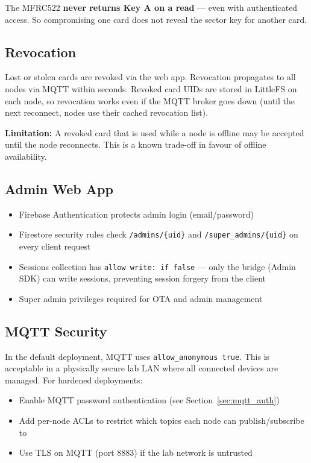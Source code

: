 The MFRC522 \textbf{never returns Key A on a read} --- even with authenticated access. So compromising one card does not reveal the sector key for another card.

\subsection{Revocation}

Lost or stolen cards are revoked via the web app. Revocation propagates to all nodes via MQTT within seconds. Revoked card UIDs are stored in LittleFS on each node, so revocation works even if the MQTT broker goes down (until the next reconnect, nodes use their cached revocation list).

\textbf{Limitation:} A revoked card that is used while a node is offline may be accepted until the node reconnects. This is a known trade-off in favour of offline availability.

\subsection{Admin Web App}

\begin{itemize}[leftmargin=1.5em]
    \item Firebase Authentication protects admin login (email/password)
    \item Firestore security rules check \texttt{/admins/\{uid\}} and \texttt{/super\_admins/\{uid\}} on every client request
    \item Sessions collection has \texttt{allow write: if false} --- only the bridge (Admin SDK) can write sessions, preventing session forgery from the client
    \item Super admin privileges required for OTA and admin management
\end{itemize}

\subsection{MQTT Security}

In the default deployment, MQTT uses \texttt{allow\_anonymous true}. This is acceptable in a physically secure lab LAN where all connected devices are managed. For hardened deployments:

\begin{itemize}[leftmargin=1.5em]
    \item Enable MQTT password authentication (see Section~\ref{sec:mqtt_auth})
    \item Add per-node ACLs to restrict which topics each node can publish/subscribe to
    \item Use TLS on MQTT (port 8883) if the lab network is untrusted
\end{itemize}

